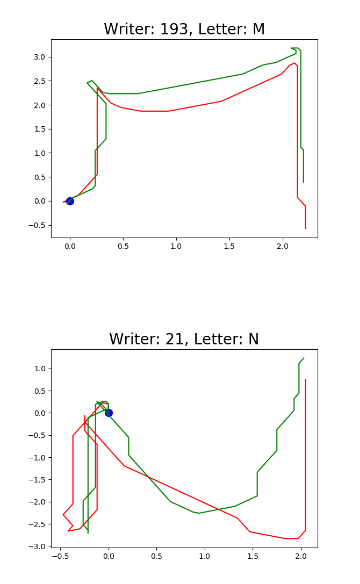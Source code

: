 \begin{figure}
\begin{subfigure}[b]{0.17\textwidth}
          \includegraphics[width=\textwidth]{images/framework/comparison_figures/M_193.png}
      \end{subfigure}
      ~
      \begin{subfigure}[b]{0.17\textwidth}
          \includegraphics[width=\textwidth]{images/framework/comparison_figures/N_21.png}
      \end{subfigure}
      ~
      \begin{subfigure}[b]{0.17\textwidth}

\end{subfigure}
\end{figure}
